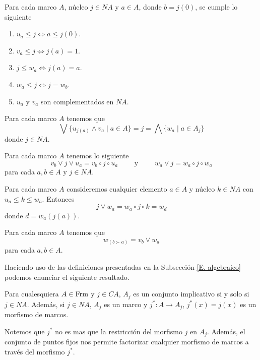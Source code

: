 \begin{lem}\label{Lemaadecuado}
Para cada marco $A$, núcleo $j\in NA$ y $a\in A$, donde $b=j(0)$, se cumple lo siguiente
\begin{enumerate}
    \item $u_a\leq j \Longleftrightarrow a\leq j(0)$.
    \item $v_a\leq j \Longleftrightarrow j(a)=1$.
    \item $j\leq w_a \Longleftrightarrow j(a)=a$.
    \item $w_a\leq j \Longleftrightarrow j=w_b$.
    \item $u_a$ y $v_a$ son complementados en $NA$.
\end{enumerate}
\end{lem}

\begin{lem}\label{Rgnucleos}
Para cada marco $A$ tenemos que 
\[
\bigvee\{u_{j(a)}\wedge v_a\mid a\in A\}=j=\bigwedge\{w_a\mid a\in A_j\}
\]
donde $j\in NA$.
\end{lem}

\begin{lem}\label{Composicionnucleos}
Para cada marco $A$ tenemos lo siguiente
\[
v_b\vee j\vee u_a= v_b \circ j\circ u_a\qquad\mbox{ y }\qquad w_a \vee j= w_a \circ j \circ w_a 
\]
para cada $a,b\in A$ y $j\in NA$.
\end{lem}

\begin{thm}\label{Teorema5.10}
Para cada marco $A$ consideremos cualquier elemento $a\in A$ y núcleo $k\in NA$ con $u_a\leq k\leq w_a$. Entonces 
\[
j\vee w_a=w_a\circ j\circ k=w_d
\]
donde $d=w_a(j(a))$.
\end{thm}

\begin{lem}\label{Lema3.0.4}
Para cada marco $A$ tenemos que 
\[
w_{(b\succ a)}=v_b\vee w_a
\]
para cada $a,b\in A$.
\end{lem}

Haciendo uso de las definiciones presentadas en la Subsección \ref{E. algebraico} podemos enunciar el siguiente resultado. 

\begin{lem}
Para cualesquiera $A\in\mathrm{Frm}$ y $j\in CA$, $A_j$ es un conjunto implicativo si y solo si $j\in NA$. Además, si $j\in NA$, $A_j$ es un marco y $j^*:A\to A_j$, $j^*(x)=j(x)$ es un morfismo de marcos.
\end{lem}

Notemos que $j^*$ no es mas que la restricción del morfismo $j$ en $A_j$. Además, el conjunto de puntos fijos nos permite factorizar cualquier morfismo de marcos a través del morfismo $j^*$.

